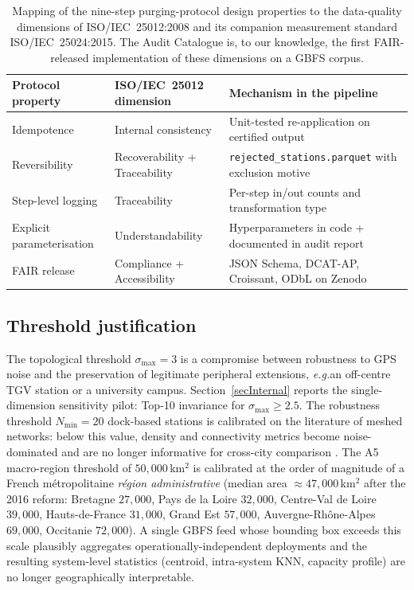 \documentclass[11pt,a4paper]{article}
\newcommand{\eg}{\emph{e.g.}}
\begin{document}
\begin{table}[ht]
\centering
\caption{Mapping of the nine-step purging-protocol design properties
to the data-quality dimensions of ISO/IEC~25012:2008 and its
companion measurement standard ISO/IEC~25024:2015. The Audit
Catalogue is, to our knowledge, the first FAIR-released
implementation of these dimensions on a GBFS corpus.}
\label{tab:iso-mapping}
\small
\begin{tabular}{@{}lll@{}}
\toprule
\textbf{Protocol property}     & \textbf{ISO/IEC~25012 dimension}   & \textbf{Mechanism in the pipeline}\\
\midrule
Idempotence                    & Internal consistency               & Unit-tested re-application on certified output\\
Reversibility                  & Recoverability + Traceability      & \texttt{rejected\_stations.parquet} with exclusion motive\\
Step-level logging             & Traceability                       & Per-step in/out counts and transformation type\\
Explicit parameterisation      & Understandability                  & Hyperparameters in code + documented in audit report\\
FAIR release                   & Compliance + Accessibility         & JSON Schema, DCAT-AP, Croissant, ODbL on Zenodo\\
\bottomrule
\end{tabular}
\end{table}

\subsection{Threshold justification}
The topological threshold $\sigma_{\max} = 3$ is a compromise between
robustness to GPS noise and the preservation of legitimate peripheral
extensions, \eg an off-centre TGV station or a university campus.
Section~\ref{secInternal} reports the single-dimension sensitivity
pilot: Top-10 invariance for $\sigma_{\max} \ge 2.5$. The robustness
threshold $N_{\min} = 20$ dock-based stations is calibrated on the
literature of meshed networks: below this value, density and
connectivity metrics become noise-dominated and are no longer
informative for cross-city comparison \cite{Saberi2018}. The A5
macro-region threshold of $50{,}000$\,km$^2$ is calibrated at the
order of magnitude of a French métropolitaine
\emph{région administrative} (median area $\approx 47{,}000$\,km$^2$
after the 2016 reform: Bretagne $27{,}000$, Pays de la Loire
$32{,}000$, Centre-Val de Loire $39{,}000$, Hauts-de-France
$31{,}000$, Grand Est $57{,}000$, Auvergne-Rhône-Alpes $69{,}000$,
Occitanie $72{,}000$). A single GBFS feed whose bounding box
exceeds this scale plausibly aggregates operationally-independent
deployments and the resulting system-level statistics
(centroid, intra-system KNN, capacity profile) are no longer
geographically interpretable.
\end{document}

